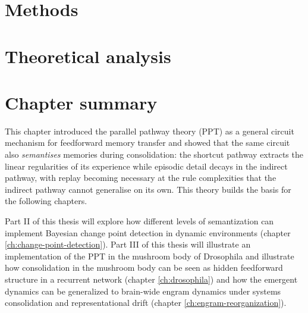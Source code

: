 \section{Methods}

\label{sec:ppt_methods}

\section{Theoretical analysis}


%

\section{Chapter summary}
This chapter introduced the parallel pathway theory (PPT) as a general circuit mechanism for feedforward memory transfer and showed that the same circuit also \emph{semantises} memories during consolidation: the shortcut pathway extracts the linear regularities of its experience while episodic detail decays in the indirect pathway, with replay becoming necessary at the rule complexities that the indirect pathway cannot generalise on its own. This theory builds the basis for the following chapters.

Part II of this thesis will explore how different levels of semantization can implement Bayesian change point detection in dynamic environments (chapter \ref{ch:change-point-detection}). Part III of this thesis will illustrate an implementation of the PPT in the mushroom body of Drosophila and illustrate how consolidation in the mushroom body can be seen as hidden feedforward structure in a recurrent network (chapter \ref{ch:drosophila}) and how the emergent dynamics can be generalized to brain-wide engram dynamics under systems consolidation and representational drift (chapter \ref{ch:engram-reorganization}).


